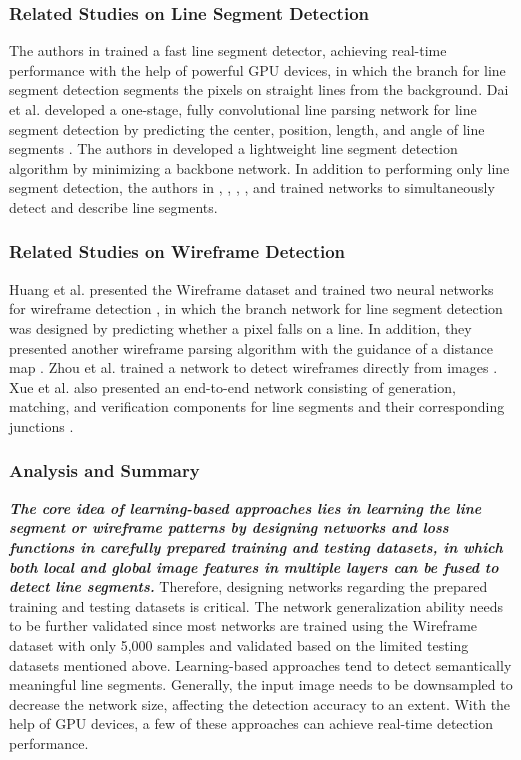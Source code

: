 \documentclass[journal,compsoc]{IEEEtran}
\begin{document}
\subsubsection{Related Studies on Line Segment Detection}
The authors in \cite{TP-LSD} trained a fast line segment detector, achieving real-time performance with the help of powerful GPU devices, in which the branch for line segment detection segments the pixels on straight lines from the background. Dai et al. developed a one-stage, fully convolutional line parsing network for line segment detection by predicting the center, position, length, and angle of line segments \cite{FullyConvolutionalLineParsing}. The authors in \cite{TowardsRealtimeandLightweightLineSegmentDetection} developed a lightweight line segment detection algorithm by minimizing a backbone network. In addition to performing only line segment detection, the authors in \cite{L2D2}, \cite{SOLD2}, \cite{Superline}, \cite{ELSD}, and \cite{SelfsupervisedLightweightLineSegmentDetectorandDescriptor} trained networks to simultaneously detect and describe line segments.

\subsubsection{Related Studies on Wireframe Detection}
Huang et al. presented the Wireframe dataset and trained two neural networks for wireframe detection \cite{LearningtoParseWireframesinImagesofMan-MadeEnvironments}, in which the branch network for line segment detection was designed by predicting whether a pixel falls on a line. In addition, they presented another wireframe parsing algorithm with the guidance of a distance map \cite{WireframeParsingWithGuidanceofDistanceMap}. Zhou et al. trained a network to detect wireframes directly from images \cite{End-to-EndWireframeParsing}. Xue et al. also presented an end-to-end network consisting of generation, matching, and verification components for line segments and their corresponding junctions \cite{Holistically-AttractedWireframeParsing}.

\subsubsection{Analysis and Summary}
\textbf{\textit{The core idea of learning-based approaches lies in learning the line segment or wireframe patterns by designing networks and loss functions in carefully prepared training and testing datasets, in which both local and global image features in multiple layers can be fused to detect line segments.}} Therefore, designing networks regarding the prepared training and testing datasets is critical. The network generalization ability needs to be further validated since most networks are trained using the Wireframe dataset with only 5,000 samples and validated based on the limited testing datasets mentioned above. Learning-based approaches tend to detect semantically meaningful line segments. Generally, the input image needs to be downsampled to decrease the network size, affecting the detection accuracy to an extent. With the help of GPU devices, a few of these approaches can achieve real-time detection performance.
\end{document}
